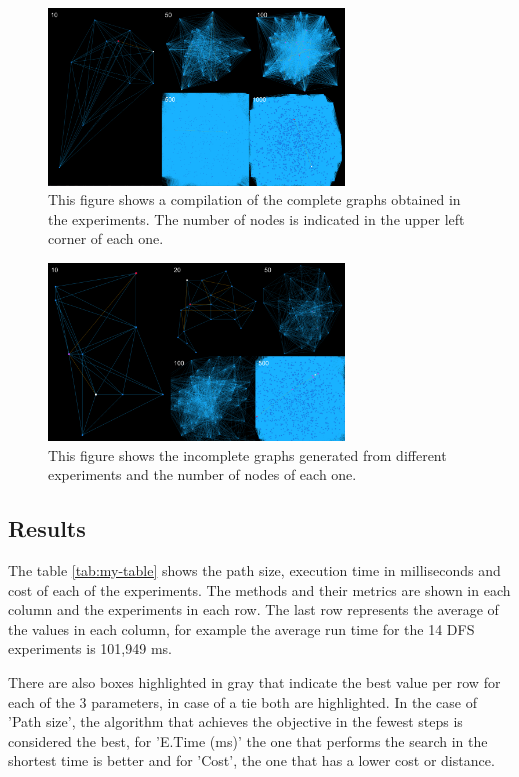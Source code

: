 \documentclass[11pt]{article}
\begin{document}
\begin{figure}[ht]
\centering
\includegraphics[width=0.7\textwidth]{Template_SBC/template-latex/grafoc.png}
\caption{This figure shows a compilation of the complete graphs obtained in the experiments. The number of nodes is indicated in the upper left corner of each one.}
\label{fig:exampleFig2}
\end{figure}

\begin{figure}[ht]
\centering
\includegraphics[width=0.7\textwidth]{Template_SBC/template-latex/grafonc.png}
\caption{This figure shows the incomplete graphs generated from different experiments and the number of nodes of each one.}
\label{fig:exampleFig3}
\end{figure}
\subsection{Results}
The table \ref{tab:my-table} shows the path size, execution time in milliseconds and cost of each of the experiments. The methods and their metrics are shown in each column and the experiments in each row.
The last row represents the average of the values in each column, for example the average run time for the 14 DFS experiments is 101,949 ms.

There are also boxes highlighted in gray that indicate the best value per row for each of the 3 parameters, in case of a tie both are highlighted.
In the case of 'Path size', the algorithm that achieves the objective in the fewest steps is considered the best, for 'E.Time (ms)' the one that performs the search in the shortest time is better and for 'Cost', the one that has a lower cost or distance.
\end{document}
